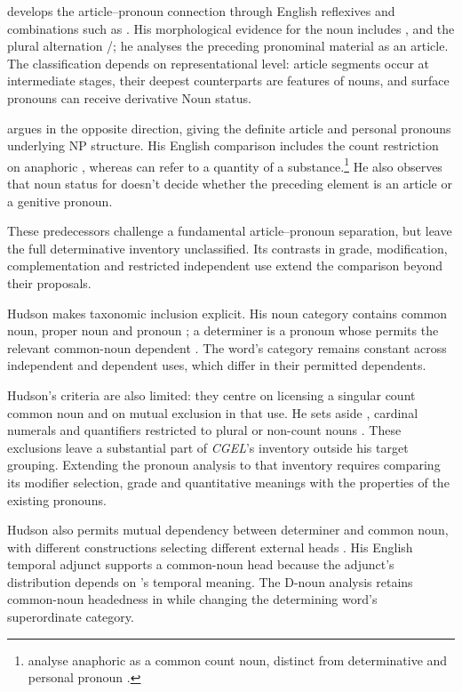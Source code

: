 \documentclass[12pt]{article}
\begin{document}
\textcite{postal1966} develops the article--pronoun connection through English reflexives and combinations such as . His morphological evidence for the noun  includes ,  and the plural alternation /; he analyses the preceding pronominal material as an article. The classification depends on representational level: article segments occur at intermediate stages, their deepest counterparts are features of nouns, and surface pronouns can receive derivative Noun status.

\textcite[197--203]{sommerstein1972} argues in the opposite direction, giving the definite article and personal pronouns underlying NP structure. His English comparison includes the count restriction on anaphoric , whereas  can refer to a quantity of a substance.\footnote{\textcite[797--798]{payne2013anaphoric} analyse anaphoric  as a common count noun, distinct from determinative  and personal pronoun .} He also observes that noun status for  doesn't decide whether the preceding element is an article or a genitive pronoun.

These predecessors challenge a fundamental article--pronoun separation, but leave the full determinative inventory unclassified. Its contrasts in grade, modification, complementation and restricted independent use extend the comparison beyond their proposals.

Hudson makes taxonomic inclusion explicit. His noun category contains common noun, proper noun and pronoun \citep[253--254]{hudson2010wordgrammar}; a determiner is a pronoun whose  permits the relevant common-noun dependent \citep[9--10]{hudson2004determiners}. The word's category remains constant across independent and dependent uses, which differ in their permitted dependents.

Hudson's criteria are also limited: they centre on licensing a singular count common noun and on mutual exclusion in that use. He sets aside , cardinal numerals and quantifiers restricted to plural or non-count nouns \citep[9--10]{hudson2004determiners}. These exclusions leave a substantial part of \textit{CGEL}'s inventory outside his target grouping. Extending the pronoun analysis to that inventory requires comparing its modifier selection, grade and quantitative meanings with the properties of the existing pronouns.

Hudson also permits mutual dependency between determiner and common noun, with different constructions selecting different external heads \citep[7--12]{hudson2004determiners}. His English temporal adjunct  supports a common-noun head because the adjunct's distribution depends on 's temporal meaning. The D-noun analysis retains common-noun headedness in  while changing the determining word's superordinate category.
\end{document}
